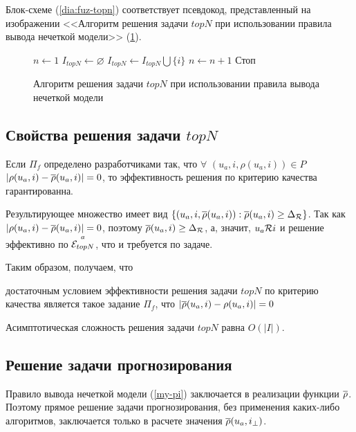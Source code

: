 Блок-схеме (\ref{dia:fuz-topn}) соответствует псевдокод, представленный на
изображении <<Алгоритм решения задачи $topN$ при использовании правила
	вывода нечеткой модели>> (\ref{alg:fuz-topn}).

\begin{figure}[htb]
	\caption{Алгоритм решения задачи $topN$ при использовании правила
	вывода нечеткой модели}
	\label{alg:fuz-topn}
		\begin{algorithmic}[1]
			\State $n \gets 1$
			\State $I_{topN} \gets \varnothing$
			\State $I_{topN} \gets I_{topN} \bigcup \{ i \}$
			\State $n \gets n + 1$
			\EndIf
			\State Стоп
			\EndIf
			\EndFor
		\end{algorithmic}
\end{figure}

\subsection{Свойства решения задачи $topN$}
\begin{trm}
	\label{pif_acc}
	Если $\Pi_f$ определено разработчиками так, что $\forall$ $(u_a, i, \rho(u_a, i)) \in P$
	$|\rho(u_a, i) - \overline{\rho}(u_a, i)| = 0$, то эффективность решения
	по критерию качества гарантированна.
\end{trm}

Результирующее множество имеет вид $\{(u_a, i, \overline{\rho}(u_a, i)): \overline{\rho}(u_a, i) \ge
\Delta_{\mathcal{R}}\}$. Так как $|\rho(u_a, i) - \overline{\rho}(u_a, i)| = 0$, поэтому
$\overline{\rho}(u_a, i) \ge \Delta_{\mathcal{R}}$, а, значит, $u_a \mathcal{R} i$ и решение эффективно по
${\overset{a}{\mathcal{E}_{topN}}}$, что и требуется по задаче.

Таким образом, получаем, что
\begin{trm}
	\label{fuz-cond-topn}
достаточным условием эффективности решения задачи $topN$ по критерию качества является
такое задание $\Pi_f$, что
$|\overline{\rho}(u_a, i) - \rho(u_a, i)| = 0$
\end{trm}

Асимптотическая сложность решения задачи $topN$ равна $O(|I|)$.

\subsection{Решение задачи прогнозирования}
Правило вывода нечеткой модели (\ref{my-pi}) заключается в реализации функции $\overline{\rho}$.
Поэтому прямое решение задачи прогнозирования, без применения каких-либо
алгоритмов, заключается только в расчете значения $\overline{\rho}(u_a, i_{\bot})$.



